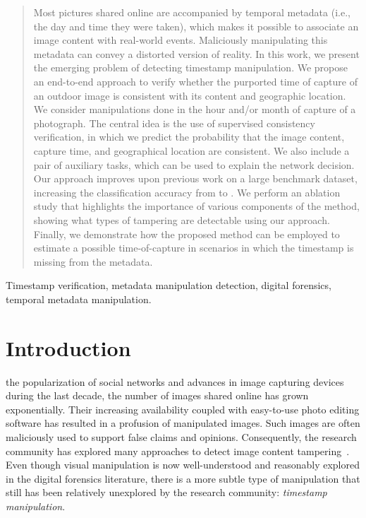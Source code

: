 \documentclass[journal]{IEEEtran}
\begin{document}
\begin{abstract}
Most pictures shared online are accompanied by temporal metadata (i.e., the day and time they were taken),  which makes it possible to associate an image content with real-world events. Maliciously manipulating this metadata can convey a distorted version of reality. In this work, we present the emerging problem of detecting timestamp manipulation. We propose an end-to-end approach to verify whether the purported time of capture of an outdoor image is consistent with its content and geographic location. We consider manipulations done in the hour and/or month of capture of a photograph. The central idea is the use of supervised consistency verification, in which we predict the probability that the image content, capture time, and geographical location are consistent. We also include a pair of auxiliary tasks, which can be used to explain the network decision. Our approach improves upon previous work on a large benchmark dataset, increasing the classification accuracy from  to . We perform an ablation study that highlights the importance of various components of the method, showing what types of tampering are detectable using our approach. Finally, we demonstrate how the proposed method can be employed to estimate a possible time-of-capture in scenarios in which the timestamp is missing from the metadata. 
\end{abstract}

\begin{IEEEkeywords}
Timestamp verification, metadata manipulation detection, digital forensics, temporal metadata manipulation.
\end{IEEEkeywords}






\IEEEpeerreviewmaketitle


\section{Introduction}
     the popularization of social networks and advances in image capturing devices during the last decade, the number of images shared online has grown exponentially. Their increasing availability coupled with easy-to-use photo editing software has resulted in a profusion of manipulated images. Such images are often maliciously used to support false claims and opinions. Consequently, the research community has explored many approaches to detect image content tampering~\cite{christlein2012evaluation, zhou2018learning, huh2018fighting}. Even though visual manipulation is now well-understood and reasonably explored in the digital forensics literature, there is a more subtle type of manipulation that still has been relatively unexplored by the research community: \emph{timestamp manipulation}. 
    
\end{document}
